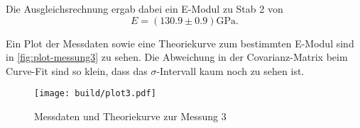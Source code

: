 Die Ausgleichsrechnung ergab dabei ein E-Modul zu Stab 2 von
\begin{equation}
	E = (130.9 \pm 0.9) \si{\giga\pascal}.
	\label{eqn:E-messung3}
\end{equation}

Ein Plot der Messdaten sowie eine Theoriekurve zum bestimmten E-Modul sind in 
\autoref{fig:plot-messung3} zu sehen. Die Abweichung in der Covarianz-Matrix beim
Curve-Fit sind so klein, dass das $\sigma$-Intervall kaum noch zu sehen ist.

\begin{figure}[H]
	\centering
	\texttt{[image: build/plot3.pdf]}
	\caption{Messdaten und Theoriekurve zur Messung 3}
	\label{fig:plot-messung3}
\end{figure}

